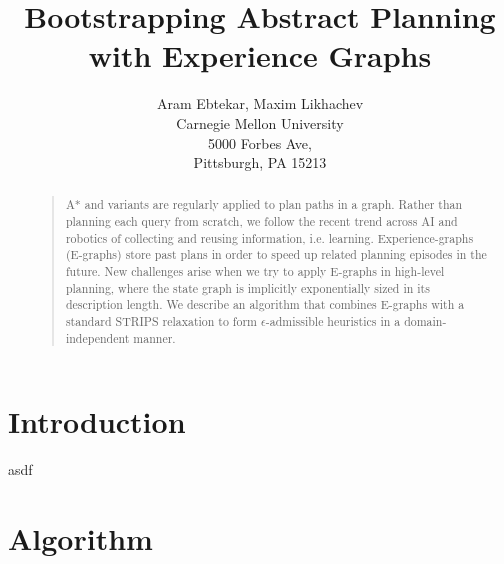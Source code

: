 \documentclass[letterpaper]{article}
\begin{document}
%
\title{Bootstrapping Abstract Planning with Experience Graphs}
\author{Aram Ebtekar, Maxim Likhachev\\
Carnegie Mellon University\\
5000 Forbes Ave,\\
Pittsburgh, PA 15213\\
}
\maketitle
\begin{abstract}
\begin{quote}
A* and variants are regularly applied to plan paths in a graph. Rather than planning each query from scratch, we follow the recent trend across AI and robotics of collecting and reusing information, i.e. learning. Experience-graphs (E-graphs) store past plans in order to speed up related planning episodes in the future. New challenges arise when we try to apply E-graphs in high-level planning, where the state graph is implicitly exponentially sized in its description length. We describe an algorithm that combines E-graphs with a standard STRIPS relaxation to form $\epsilon$-admissible heuristics in a domain-independent manner.
\end{quote}
\end{abstract}

\section{Introduction}
asdf

\section{Algorithm}
\end{document}
